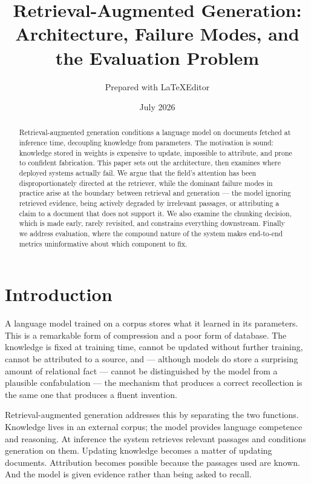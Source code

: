 \documentclass[11pt,a4paper]{article}
\title{Retrieval-Augmented Generation:\\
       Architecture, Failure Modes, and the Evaluation Problem}
\author{Prepared with LaTeXEditor}
\date{July 2026}
\begin{document}
\maketitle

\begin{abstract}
Retrieval-augmented generation conditions a language model on documents
fetched at inference time, decoupling knowledge from parameters. The
motivation is sound: knowledge stored in weights is expensive to update,
impossible to attribute, and prone to confident fabrication. This paper sets
out the architecture, then examines where deployed systems actually fail. We
argue that the field's attention has been disproportionately directed at the
retriever, while the dominant failure modes in practice arise at the boundary
between retrieval and generation --- the model ignoring retrieved evidence,
being actively degraded by irrelevant passages, or attributing a claim to a
document that does not support it. We also examine the chunking decision,
which is made early, rarely revisited, and constrains everything downstream.
Finally we address evaluation, where the compound nature of the system makes
end-to-end metrics uninformative about which component to fix.
\end{abstract}

\tableofcontents

\section{Introduction}
\label{sec:intro}

A language model trained on a corpus stores what it learned in its parameters.
This is a remarkable form of compression and a poor form of database. The
knowledge is fixed at training time, cannot be updated without further
training, cannot be attributed to a source, and --- although models do store a surprising amount of
relational fact \cite{petroni2019} --- cannot be distinguished by the
model from a plausible confabulation --- the mechanism that produces a correct
recollection is the same one that produces a fluent invention.

Retrieval-augmented generation \cite{lewis2020} addresses this by separating
the two functions. Knowledge lives in an external corpus; the model provides
language competence and reasoning. At inference the system retrieves relevant
passages and conditions generation on them. Updating knowledge becomes a
matter of updating documents. Attribution becomes possible because the
passages used are known. And the model is given evidence rather than being
asked to recall.
\end{document}
